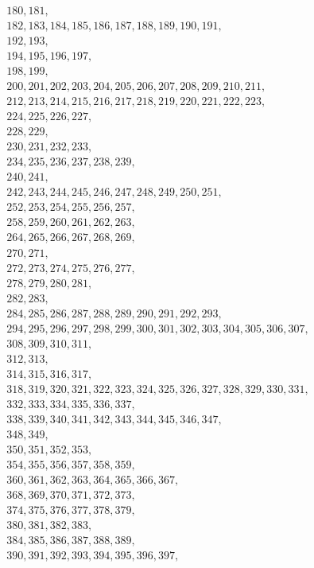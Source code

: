\begin{multline}
180, 181, \\
182, 183, 184, 185, 186, 187, 188, 189, 190, 191, \\
192, 193, \\
194, 195, 196, 197, \\
198, 199, \\
200, 201, 202, 203, 204, 205, 206, 207, 208, 209, 210, 211, \\
212, 213, 214, 215, 216, 217, 218, 219, 220, 221, 222, 223, \\
224, 225, 226, 227, \\
228, 229, \\
230, 231, 232, 233, \\
234, 235, 236, 237, 238, 239, \\
240, 241, \\
242, 243, 244, 245, 246, 247, 248, 249, 250, 251, \\
252, 253, 254, 255, 256, 257, \\
258, 259, 260, 261, 262, 263, \\
264, 265, 266, 267, 268, 269, \\
270, 271, \\
272, 273, 274, 275, 276, 277, \\
278, 279, 280, 281, \\
282, 283, \\
284, 285, 286, 287, 288, 289, 290, 291, 292, 293, \\
294, 295, 296, 297, 298, 299, 300, 301, 302, 303, 304, 305, 306, 307, \\
308, 309, 310, 311, \\
312, 313, \\
314, 315, 316, 317, \\
318, 319, 320, 321, 322, 323, 324, 325, 326, 327, 328, 329, 330, 331, \\
332, 333, 334, 335, 336, 337, \\
338, 339, 340, 341, 342, 343, 344, 345, 346, 347, \\
348, 349, \\
350, 351, 352, 353, \\
354, 355, 356, 357, 358, 359, \\
360, 361, 362, 363, 364, 365, 366, 367, \\
368, 369, 370, 371, 372, 373, \\
374, 375, 376, 377, 378, 379, \\
380, 381, 382, 383, \\
384, 385, 386, 387, 388, 389, \\
390, 391, 392, 393, 394, 395, 396, 397, \\

\end{multline}
